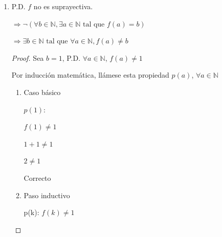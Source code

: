 \documentclass{article}
\begin{document}
\begin{enumerate}
\begin{enumerate}
\begin{enumerate}
\begin{proof}
                        $f(a) = a + 1$

                        $f(b) = b + 1$
                        \vspace{\baselineskip}

                        $\Rightarrow a + 1 = b + 1$

                        $a + 1 - 1 = b + 1 - 1$

                        $a = b$
                    \end{proof}
                \item[2.] P.D. \(f\) no es suprayectiva.

                    $\Rightarrow \neg (\forall b \in \mathbb{N}, \exists a \in \mathbb{N} \text{ tal que } f(a) = b)$
                    
                    $\Rightarrow \exists b \in \mathbb{N} \text{ tal que } \forall a \in \mathbb{N}, f(a) \neq b$
                    \vspace{\baselineskip}
                    
                    \begin{proof}
                        Sea \(b = 1\), P.D. \(\forall a \in \mathbb{N} \), \( f(a) \neq 1 \)
                        \vspace{\baselineskip}
                        
                        Por inducción matemática, llámese esta propiedad \(p(a)\), \(\forall a \in \mathbb{N}\)
                        \begin{enumerate}
                            \item[1.] Caso básico
                        
                                \(p(1):\)

                                \(f(1) \neq 1\)

                                \(1 + 1 \neq 1\)

                                \(2 \neq 1\)

                                Correcto
                                \vspace{\baselineskip}
                                
                            \item[2.] Paso inductivo
                            
                                p(k): \( f(k) \neq 1 \)
                            

\end{enumerate}
\end{proof}
\end{enumerate}
\end{enumerate}
\end{enumerate}
\end{document}
